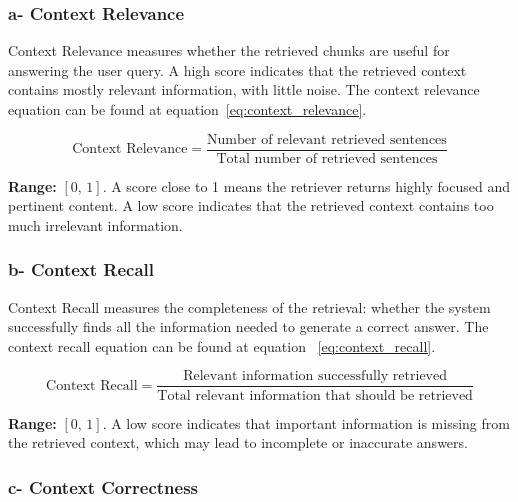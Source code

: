 \subsubsection{a- Context Relevance}

Context Relevance measures whether the retrieved chunks are useful for
answering the user query. A high score indicates that the retrieved
context contains mostly relevant information, with little noise.
The context relevance equation can be found at equation~\ref{eq:context_relevance}.

\begin{equation}
\text{Context Relevance} =
\frac{\text{Number of relevant retrieved sentences}}
     {\text{Total number of retrieved sentences}}
\label{eq:context_relevance}
\end{equation}

\textbf{Range:} $[0,\,1]$. A score close to 1 means the retriever
returns highly focused and pertinent content. A low score indicates
that the retrieved context contains too much irrelevant information.


\subsubsection{b- Context Recall}

Context Recall measures the completeness of the retrieval: whether the
system successfully finds all the information needed to generate a
correct answer. The context recall equation can be found at equation
~\ref{eq:context_recall}.

\begin{equation}
\text{Context Recall} =
\frac{\text{Relevant information successfully retrieved}}
     {\text{Total relevant information that should be retrieved}}
\label{eq:context_recall}
\end{equation}

\textbf{Range:} $[0,\,1]$. A low score indicates that important
information is missing from the retrieved context, which may lead to
incomplete or inaccurate answers.


\subsubsection{c- Context Correctness}

